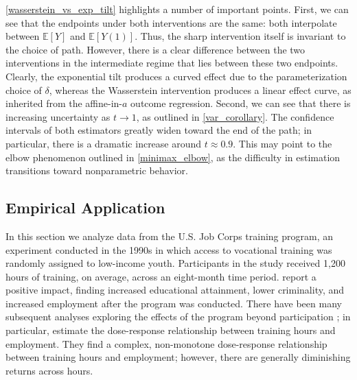 \documentclass[11pt,twoside]{article}
\theoremstyle{definition}
\theoremstyle{remark}
\begin{document}
\cref{wasserstein_vs_exp_tilt} highlights a number of important points. First, we can see that the endpoints under both interventions are the same: both interpolate between $\mathbb{E}[Y]$ and $\mathbb{E}[Y(1)]$. Thus, the sharp intervention itself is invariant to the choice of path. However, there is a clear difference between the two interventions in the intermediate regime that lies between these two endpoints. Clearly, the exponential tilt produces a curved effect due to the parameterization choice of $\delta$, whereas the Wasserstein intervention produces a linear effect curve, as inherited from the affine-in-$a$ outcome regression. Second, we can see that there is increasing uncertainty as $t \to 1$, as outlined in \cref{var_corollary}. The confidence intervals of both estimators greatly widen toward the end of the path; in particular, there is a dramatic increase around $t \approx 0.9$. This may point to the elbow phenomenon outlined in \cref{minimax_elbow}, as the difficulty in estimation transitions toward nonparametric behavior.


\subsection{Empirical Application} \label{application_subsection}

In this section we analyze data from the U.S. Job Corps training program, an experiment conducted in the 1990s in which access to vocational training was randomly assigned to low-income youth. Participants in the study received 1,200 hours of training, on average, across an eight-month time period. \cite{schochet2008} report a positive impact, finding increased educational attainment, lower criminality, and increased employment after the program was conducted. There have been many subsequent analyses exploring the effects of the program beyond participation \citep{flores2012, frolich2017, huber2020, Colangelo02012026}; in particular, \cite{Colangelo02012026} estimate the dose-response relationship between training hours and employment. They find a complex, non-monotone dose-response relationship between training hours and employment; however, there are generally diminishing returns across hours.
\end{document}
